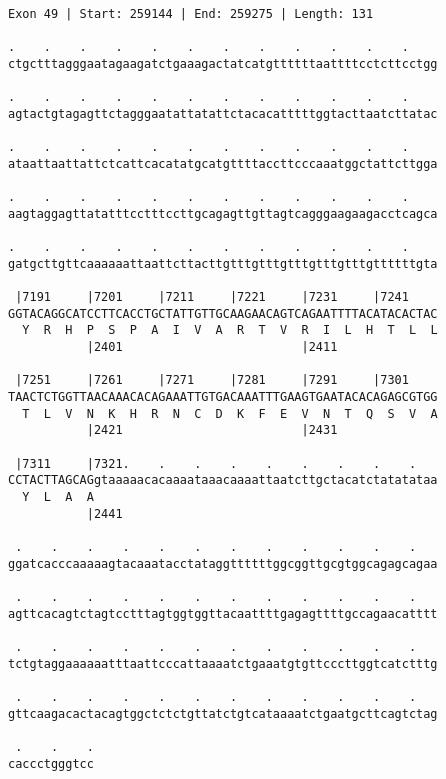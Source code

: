 \documentclass{article}
\begin{document}
\begin{Verbatim}
Exon 49 | Start: 259144 | End: 259275 | Length: 131
 
.    .    .    .    .    .    .    .    .    .    .    .    
ctgctttagggaatagaagatctgaaagactatcatgttttttaattttcctcttcctgg
  
.    .    .    .    .    .    .    .    .    .    .    .    
agtactgtagagttctagggaatattatattctacacatttttggtacttaatcttatac
  
.    .    .    .    .    .    .    .    .    .    .    .    
ataattaattattctcattcacatatgcatgttttaccttcccaaatggctattcttgga
  
.    .    .    .    .    .    .    .    .    .    .    .    
aagtaggagttatatttcctttccttgcagagttgttagtcagggaagaagacctcagca
  
.    .    .    .    .    .    .    .    .    .    .    .    
gatgcttgttcaaaaaattaattcttacttgtttgtttgtttgtttgtttgttttttgta
  
 |7191     |7201     |7211     |7221     |7231     |7241    
GGTACAGGCATCCTTCACCTGCTATTGTTGCAAGAACAGTCAGAATTTTACATACACTAC
  Y  R  H  P  S  P  A  I  V  A  R  T  V  R  I  L  H  T  L  L
           |2401                         |2411              
  
 |7251     |7261     |7271     |7281     |7291     |7301    
TAACTCTGGTTAACAAACACAGAAATTGTGACAAATTTGAAGTGAATACACAGAGCGTGG
  T  L  V  N  K  H  R  N  C  D  K  F  E  V  N  T  Q  S  V  A
           |2421                         |2431              
  
 |7311     |7321.    .    .    .    .    .    .    .    .   
CCTACTTAGCAGgtaaaaacacaaaataaacaaaattaatcttgctacatctatatataa
  Y  L  A  A                                                
           |2441                                            
  
 .    .    .    .    .    .    .    .    .    .    .    .   
ggatcacccaaaaagtacaaatacctataggttttttggcggttgcgtggcagagcagaa
  
 .    .    .    .    .    .    .    .    .    .    .    .   
agttcacagtctagtcctttagtggtggttacaattttgagagttttgccagaacatttt
  
 .    .    .    .    .    .    .    .    .    .    .    .   
tctgtaggaaaaaatttaattcccattaaaatctgaaatgtgttcccttggtcatctttg
  
 .    .    .    .    .    .    .    .    .    .    .    .   
gttcaagacactacagtggctctctgttatctgtcataaaatctgaatgcttcagtctag
  
 .    .    .
caccctgggtcc
\end{Verbatim}
\newpage
\end{document}
